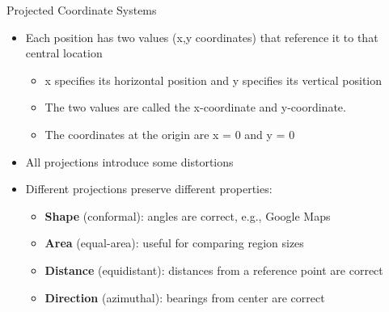 \documentclass[hyperref={pdfpagelabels=false}]{beamer}
\begin{document}
 
\begin{frame}{Projected Coordinate Systems}
\begin{itemize}
	
	\item Each position has two values (x,y coordinates) that reference it to that central location
	\vspace{0.2cm}
	\begin{itemize}
		\item x specifies its horizontal position and y specifies its vertical position
		\vspace{0.2cm}
		\item The two values are called the x-coordinate and y-coordinate. 
		\vspace{0.2cm}
		\item The coordinates at the origin are x = 0 and y = 0
	\end{itemize}
	\vspace{0.2cm}
	\item All projections introduce some distortions 
	\vspace{0.2cm}
	\item Different projections preserve different properties:
	\vspace{0.2cm}
	\begin{itemize}
		\item \textbf{Shape} (conformal): angles are correct, e.g., Google Maps
		\vspace{0.1cm}
		\item \textbf{Area} (equal-area): useful for comparing region sizes
		\vspace{0.1cm}
		\item \textbf{Distance} (equidistant): distances from a reference point are correct
		\vspace{0.1cm}
		\item \textbf{Direction} (azimuthal): bearings from center are correct
	\end{itemize}
	
\end{itemize}
\end{frame}
 
\end{document}
